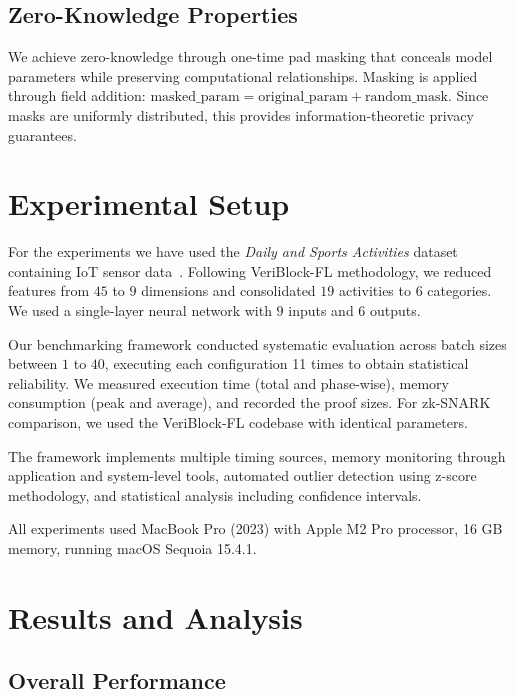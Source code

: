 \documentclass[runningheads]{llncs}
\begin{document}
\subsection{Zero-Knowledge Properties}

We achieve zero-knowledge through one-time pad masking that conceals model parameters while preserving computational relationships.
Masking is applied through field addition: $\text{masked\_param} = \text{original\_param} + \text{random\_mask}$. Since masks are uniformly distributed, this provides information-theoretic privacy guarantees.



\section{Experimental Setup}

For the experiments we have used the {\em Daily and Sports Activities} dataset containing IoT sensor data~\cite{daily_and_sports_activities_256}.
Following VeriBlock-FL methodology, we reduced features from $45$ to $9$ dimensions and consolidated $19$ activities to $6$ categories. We used a single-layer neural network with $9$ inputs and $6$ outputs.

Our benchmarking framework conducted systematic evaluation across batch sizes between $1$ to $40$, executing each configuration 11 times to obtain statistical reliability.
We measured execution time (total and phase-wise), memory consumption (peak and average), and recorded the proof sizes.
For zk-SNARK comparison, we used the VeriBlock-FL codebase with identical parameters.

The framework implements multiple timing sources, memory monitoring through application and system-level tools, automated outlier detection using z-score methodology, and statistical analysis including confidence intervals.

All experiments used MacBook Pro (2023) with Apple M2 Pro processor, 16 GB memory, running macOS Sequoia 15.4.1.


\section{Results and Analysis}

\subsection{Overall Performance}
\end{document}
